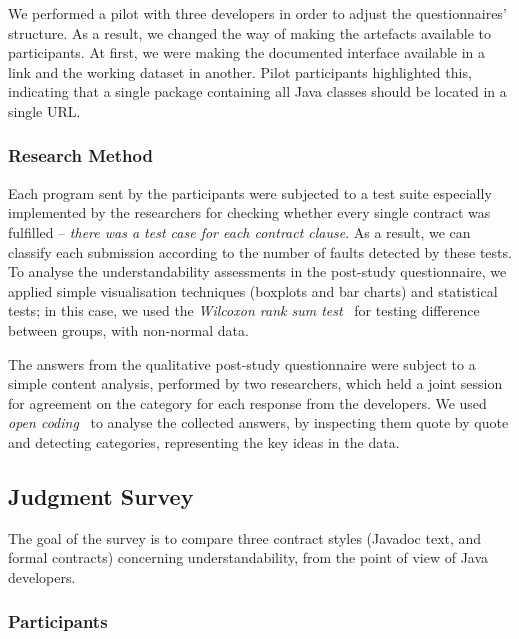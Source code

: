 We performed a pilot with three developers in order to adjust the questionnaires' structure.
As a result, we changed the way of making the artefacts available to participants. 
At first, we were making the documented interface available in a link and the working dataset in another. 
Pilot participants highlighted this, indicating that a single package containing all Java classes should be located in a single URL.

\subsubsection{Research Method}
\label{sec:labmethod}

Each program sent by the participants were subjected to a test suite especially implemented by the researchers for checking whether every single contract was fulfilled -- \emph{there was a test case for each contract clause}.
As a result, we can classify each submission according to the number of faults detected by these tests.
To analyse the understandability assessments in the post-study questionnaire, we applied simple visualisation techniques (boxplots and bar charts) and statistical tests; in this case, we used the \emph{Wilcoxon rank sum test}~\cite{statistical} for testing difference between groups, with non-normal data.

The answers from the qualitative post-study questionnaire were subject to a simple content analysis, performed by two researchers, which held a joint session for agreement on the category for each response from the developers. 
 We used \emph{open coding}~\cite{Price2010} to analyse the collected answers, by inspecting them quote by quote and detecting categories, representing the key ideas in the data.




\subsection{Judgment Survey}
\label{sec:survey}

The goal of the survey is to compare three contract styles (Javadoc text, \contractjdoc{} and formal contracts) concerning understandability, from the point of view of Java developers. 

\subsubsection{Participants}
\label{sec:surveyPart}

